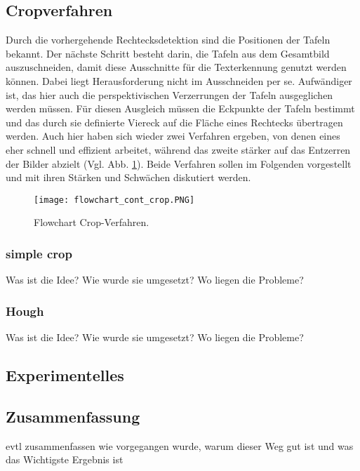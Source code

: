 \subsection{Cropverfahren}

Durch die vorhergehende Rechtecksdetektion sind die Positionen der Tafeln bekannt. Der nächste Schritt besteht darin, die Tafeln aus dem Gesamtbild auszuschneiden, damit diese Ausschnitte für die Texterkennung genutzt werden können. Dabei liegt Herausforderung nicht im Ausschneiden per se. Aufwändiger ist, das hier auch die perspektivischen Verzerrungen der Tafeln ausgeglichen werden müssen. Für diesen Ausgleich müssen die Eckpunkte der Tafeln bestimmt und das durch sie definierte Viereck auf die Fläche eines Rechtecks übertragen werden.
Auch hier haben sich wieder zwei Verfahren ergeben, von denen eines eher schnell und effizient arbeitet, während das zweite stärker auf das Entzerren der Bilder abzielt (Vgl. Abb. \ref{fig:flowchartcrop}). Beide Verfahren sollen im Folgenden vorgestellt und mit ihren Stärken und Schwächen diskutiert werden.
\begin{figure}[h!]
\centering
\texttt{[image: flowchart\_cont\_crop.PNG]}
\caption{Flowchart Crop-Verfahren.}
\label{fig:flowchartcrop}
\end{figure}

\subsubsection{simple crop}


Was ist die Idee?
Wie wurde sie umgesetzt?
Wo liegen die Probleme?

\subsubsection{Hough}

Was ist die Idee?
Wie wurde sie umgesetzt?
Wo liegen die Probleme?

\subsection{Experimentelles}

\subsection{Zusammenfassung}
evtl zusammenfassen wie vorgegangen wurde, warum dieser Weg gut ist und was das Wichtigste Ergebnis ist